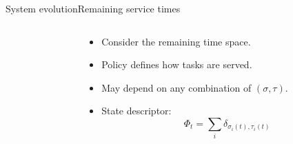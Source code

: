 \documentclass[aspectratio=169]{beamer}
\begin{document}
\begin{frame}{System evolution}{Remaining service times}
\begin{columns}
\begin{column}{0.45\textwidth}
	\end{column}
	\begin{column}{0.55\textwidth}
		\begin{itemize}
			\item<1-> Consider the remaining time space.
			\item<3-> \alert{Policy} defines how tasks are served.
			\item<3-> May depend on any combination of $(\sigma,\tau)$.
			\item<5-> State descriptor:
			 \begin{equation*}
				\Phi_t = \sum_i \delta_{\sigma_i(t),\tau_i(t)}
			 \end{equation*}
		\end{itemize}
	\end{column}
	\end{columns}

\end{frame}
\end{document}
